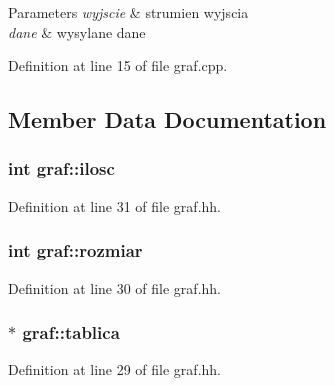\begin{DoxyParams}{\-Parameters}
{\em wyjscie} & strumien wyjscia \\
\hline
{\em dane} & wysylane dane \\
\hline
\end{DoxyParams}


\-Definition at line 15 of file graf.\-cpp.



\subsection{\-Member \-Data \-Documentation}
\hypertarget{classgraf_ad9204c0bbc75a2bef4a43200672f9694}{
\subsubsection[{ilosc}]{\setlength{\rightskip}{0pt plus 5cm}int {\bf graf\-::ilosc}}}\label{classgraf_ad9204c0bbc75a2bef4a43200672f9694}


\-Definition at line 31 of file graf.\-hh.

\hypertarget{classgraf_a596da8a77b680d7ec408b1253c2c43c3}{
\subsubsection[{rozmiar}]{\setlength{\rightskip}{0pt plus 5cm}int {\bf graf\-::rozmiar}}}\label{classgraf_a596da8a77b680d7ec408b1253c2c43c3}


\-Definition at line 30 of file graf.\-hh.

\hypertarget{classgraf_a028d547c797438718da6241a28b32db5}{
\subsubsection[{tablica}]{$\ast$ {\bf graf\-::tablica}}}\label{classgraf_a028d547c797438718da6241a28b32db5}


\-Definition at line 29 of file graf.\-hh.

